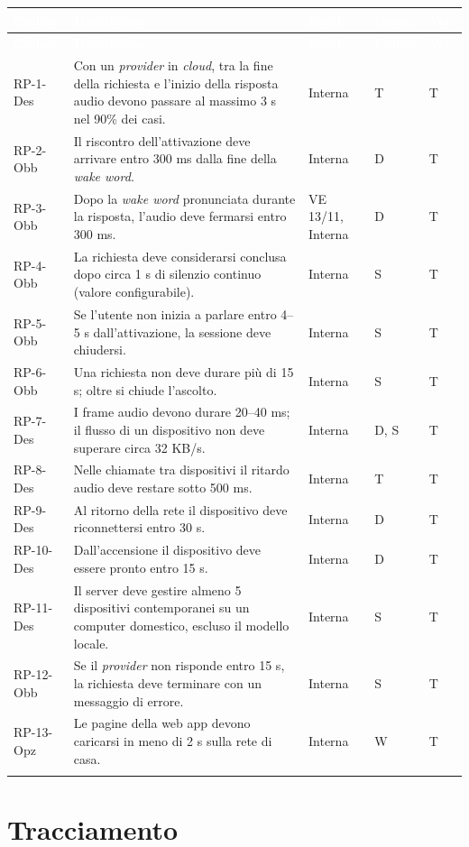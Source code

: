 \documentclass[12pt,a4paper]{article}
\newcommand{\thc}[1]{\textcolor{white}{\textbf{#1}}}
\newcommand{\rl}{\\ \arrayrulecolor{bfline}\hline}
\begin{document}
\begin{longtable}{>{\raggedright\arraybackslash}p{}>{\raggedright\arraybackslash}p{}>{\raggedright\arraybackslash}p{}>{\raggedright\arraybackslash}p{}>{\centering\arraybackslash}p{}}
\rowcolor{bfblue}\thc{Codice} & \thc{Descrizione} & \thc{Fonti} & \thc{Comp.} & \thc{Ver.} \\
\endfirsthead
\rowcolor{bfblue}\thc{Codice} & \thc{Descrizione} & \thc{Fonti} & \thc{Comp.} & \thc{Ver.} \\
\endhead
RP-1-Des & Con un \emph{provider} in \emph{cloud}, tra la fine della richiesta e l'inizio della risposta audio devono passare al massimo 3 s nel 90\% dei casi. & Interna & T & T \rl
RP-2-Obb & Il riscontro dell'attivazione deve arrivare entro 300 ms dalla fine della \emph{wake word}. & Interna & D & T \rl
RP-3-Obb & Dopo la \emph{wake word} pronunciata durante la risposta, l'audio deve fermarsi entro 300 ms. & VE 13/11, Interna & D & T \rl
RP-4-Obb & La richiesta deve considerarsi conclusa dopo circa 1 s di silenzio continuo (valore configurabile). & Interna & S & T \rl
RP-5-Obb & Se l'utente non inizia a parlare entro 4--5 s dall'attivazione, la sessione deve chiudersi. & Interna & S & T \rl
RP-6-Obb & Una richiesta non deve durare più di 15 s; oltre si chiude l'ascolto. & Interna & S & T \rl
RP-7-Des & I frame audio devono durare 20--40 ms; il flusso di un dispositivo non deve superare circa 32 KB/s. & Interna & D, S & T \rl
RP-8-Des & Nelle chiamate tra dispositivi il ritardo audio deve restare sotto 500 ms. & Interna & T & T \rl
RP-9-Des & Al ritorno della rete il dispositivo deve riconnettersi entro 30 s. & Interna & D & T \rl
RP-10-Des & Dall'accensione il dispositivo deve essere pronto entro 15 s. & Interna & D & T \rl
RP-11-Des & Il server deve gestire almeno 5 dispositivi contemporanei su un computer domestico, escluso il modello locale. & Interna & S & T \rl
RP-12-Obb & Se il \emph{provider} non risponde entro 15 s, la richiesta deve terminare con un messaggio di errore. & Interna & S & T \rl
RP-13-Opz & Le pagine della web app devono caricarsi in meno di 2 s sulla rete di casa. & Interna & W & T \rl
\end{longtable}

\section{Tracciamento}\label{sec:tracciamento}
\end{document}
